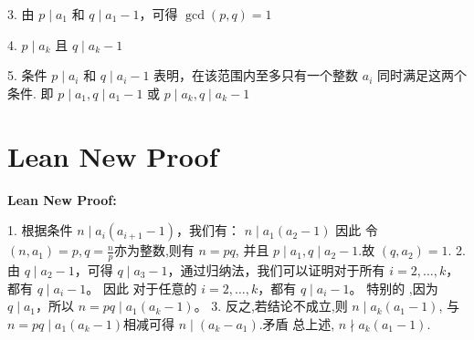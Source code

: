 \documentclass[a4paper]{article}
\begin{document}
    3. 由 $p \mid a_1$ 和 $q \mid a_1-1$，可得 $\gcd(p, q) = 1$

    4. $p \mid a_k$ 且 $q \mid a_k-1$

    5. 条件 $p \mid a_i$ 和 $q \mid a_i-1$ 表明，在该范围内至多只有一个整数 $a_i$ 同时满足这两个条件.
    即 $p \mid a_1, q \mid a_1-1$ 或 $p \mid a_k, q \mid a_k-1$


\section*{Lean New Proof}
    \textbf{Lean New Proof:}
    
    1. 根据条件 $n \mid a_i(a_{i+1}-1)$，我们有：
    $n \mid a_1(a_2 - 1)$ 因此 令 $(n,a_1) = p,q =\frac{n}{p}$亦为整数,则有 $n = pq$,
    并且 $p \mid a_1,q \mid a_2 - 1$.故 $(q,a_2) = 1$.
    2. 由 $q \mid a_2 - 1$，可得 $q \mid a_3 - 1$，通过归纳法，我们可以证明对于所有 $i = 2, \ldots, k$，都有 $q \mid a_i - 1$。
    因此 对于任意的 $i = 2, \ldots, k$，都有 $q \mid a_i - 1$。
    特别的 ,因为 $q \mid a_1$，所以 $n = pq \mid a_1(a_k - 1)$。
    3. 反之,若结论不成立,则 $n \mid a_k(a_1 - 1)$, 与$n = pq \mid a_1(a_k - 1)$相减可得 $n \mid (a_k - a_1)$.矛盾
    总上述, $n \nmid a_k(a_1 - 1)$.
    
\end{document}
